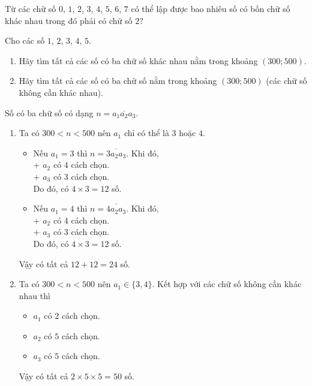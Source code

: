 \begin{bt}%
	Từ các chữ số $0$, $1$, $2$, $3$, $4$, $5$, $6$, $7$ có thể lập được bao nhiêu số có bốn chữ số khác nhau trong đó phải có chữ số $2$?
\end{bt}



\begin{bt}%
	Cho các  số $1$, $2$, $3$, $4$, $5$.
	\begin{enumerate}
		\item Hãy tìm tất cả các số có ba chữ số khác nhau nằm trong khoảng $(300; 500)$.
		\item Hãy tìm tất cả các số có ba chữ số  nằm trong khoảng $(300; 500)$ (các chữ số không cần khác nhau).
	\end{enumerate}
	\loigiai
	{Số có ba chữ số có dạng $n=\overline{a_1a_2a_3}$.
		\begin{enumerate}
			\item Ta có $300<n<500$ nên $a_1$ chỉ có thể là $3$ hoặc $4$.
			\begin{itemize}
				\item Nếu $a_1=3$ thì $n=\overline{3a_2a_3}$. Khi đó,\\
				+ $a_2$ có $4$ cách chọn.\\
				+ $a_3$ có $3$ cách chọn.\\
				Do đó, có $4\times 3=12$ số.
				\item Nếu $a_1=4$ thì $n=\overline{4a_2a_3}$. Khi đó,\\
				+ $a_2$ có $4$ cách chọn.\\
				+ $a_3$ có $3$ cách chọn.\\
				Do đó, có $4\times 3=12$ số.
			\end{itemize}
			Vậy có tất cả $12+12=24$ số.
			\item Ta có $300<n<500$ nên $a_1\in\{3, 4\}$. Kết hợp với các chữ số không cần khác nhau thì
			\begin{itemize}
				\item $a_1$ có $2$ cách chọn.
				\item $a_2$ có $5$ cách chọn.
				\item $a_3$ có $5$ cách chọn.
			\end{itemize}
			Vậy có tất cả $2\times 5\times 5=50$ số.
		\end{enumerate}		
	}
\end{bt}

